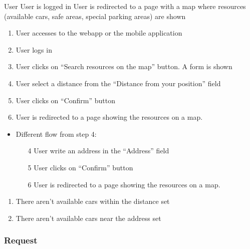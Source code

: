 {User}
{}
{User is logged in}
{User is redirected to a page with a map where resources (available cars, safe areas, special parking areas)  are shown}
{
\begin{enumerate}
	\item User accesses to the webapp or the mobile application
	\item User logs in
	\item User clicks on ``Search resources on the map'' button. A form is shown
	\item User select a distance from the ``Distance from your position'' field
	\item User clicks on ``Confirm'' button
	\item User is redirected to a page showing the resources on a map.
\end{enumerate}
}
{
\begin{itemize}
\item Different flow from step 4:
	\begin{enumerate}
	\item[4] User write an address in the ``Address'' field 
	\item[5] User clicks on ``Confirm'' button	
	\item[6] User is redirected to a page showing the resources on a map.
 
\end{enumerate}

\end{itemize}


}
{
\begin{enumerate}
\item There aren't available cars within the distance set 
\item There aren't available cars near the address set
\end{enumerate}

}

\subsubsection{Request}

